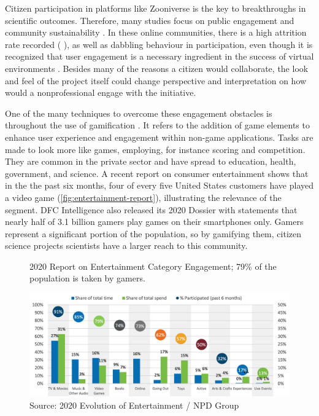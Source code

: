 Citizen participation in platforms like Zooniverse is the key to breakthroughs in scientific outcomes. Therefore, many studies focus on public engagement and community sustainability \cite{aristeidou2017profiles}. In these online communities, there is a high attrition rate recorded (\cite{nov2011technology} \cite{ponciano2015finding}), as well as dabbling behaviour \cite{eveleigh2014designing} in participation, even though it is recognized that user engagement is a necessary ingredient in the success of virtual environments \cite{verhagen2015benefitting}. Besides many of the reasons a citizen would collaborate, the look and feel of the project itself could change perspective and interpretation on how would a nonprofessional engage with the initiative.

One of the many techniques to overcome these engagement obstacles is throughout the use of gamification \cite{bowser2013using}. It refers to the addition of game elements to enhance user experience and engagement within non-game applications. Tasks are made to look more like games, employing, for instance scoring and competition. They are common in the private sector and have spread to education, health, government, and science. A recent report on consumer entertainment shows that in the the past six months, four of every five United States customers have played a video game (\autoref{fig:entertainment-report}), illustrating the relevance of the segment. DFC Intelligence also released its 2020 Dossier with statements that nearly half of 3.1 billion gamers play games on their smartphones only. Gamers represent a significant portion of the population, so by gamifying them, citizen science projects scientists have a larger reach to this community.

\begin{figure}[h]
    \centering
    \caption{2020 Report on Entertainment Category Engagement; 79\% of the population is taken by gamers.}
    \includegraphics[width=\linewidth]{images/game.png}
    \caption*{Source: 2020 Evolution of Entertainment / NPD Group}
    \label{fig:entertainment-report}
\end{figure}

